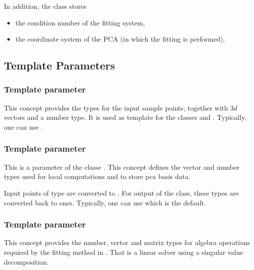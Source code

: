 In addition, the class  stores 
\begin{itemize}
\item
the condition number of the fitting system,
\item 
the coordinate system of the PCA (in which the fitting is performed).
\end{itemize}

\subsection{Template Parameters}

\subsubsection{Template parameter }

This concept provides the types for the input sample points, together
with $3d$ vectors and a number type. It is used as template for the
classes
 and 
. Typically, one can use .

\subsubsection{Template parameter }
This is a parameter of the classe 
. 
This concept defines the vector and number types used for local
computations and to store pca basis data.  

Input points of type
 are converted to
. For output of the  class,
these types are converted back to  ones.  Typically,
one can use
 which is the default.

\subsubsection{Template parameter }

This concept provides the number, vertor and matrix types for algebra
operations required by the fitting method in
. That is a linear solver using a singular value decomposition.

